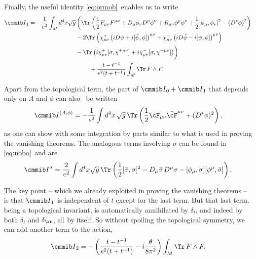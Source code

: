 Finally,  the useful identity \eqref{eq:ormob}\ enables us to write
\setcounter{equation}{45}
\begin{equation}\label{eq:nuseful}
\begin{aligned}{{\cmmib I}}_1=-{1\over e^2}\int_Md^4x \sqrt
g&\left(\Tr\left({1\over 2}F_{\mu\nu} F^{\mu\nu}+D_\mu\phi_\nu
D^\mu\phi^\nu +R_{\mu\nu}\phi^\mu\phi^\nu+ {1\over
2}[\phi_\mu,\phi_\nu]^2-(D^*\phi)^2
  \right)\right.\\ &-
2\Tr\left(\chi^+_{\mu\nu}\left(iD\psi+i[\tilde\psi,\phi]\right)^{\mu\nu}
+\chi^-_{\mu\nu}\left(iD\tilde\psi-i[\psi,\phi]\right)^{\mu\nu}\right)\\
&-\Tr\left(i\chi^+_{\mu\nu}[\sigma,\chi^{+\mu\nu}]+
i\chi^-_{\mu\nu}[\sigma,\chi^{-\mu\nu}] \right)\biggr)\\ &
~~~~~~~+{t-t^{-1}\over e^2(t+t^{-1})}\int_M\Tr\, F\wedge F.\\\end{aligned}
\end{equation}

Apart from the topological term, the part of ${{\cmmib
I}}_0+{{\cmmib I}}_1$ that depends only on $A$ and $\phi$ can also
\cite{ref53}\ be written %
\setcounter{equation}{46}
\begin{equation}\label{eq:wingo}
{{\cmmib I}}^{(A,\phi)}=-{1\over
e^2}\int d^4x\,\sqrt g\, \Tr\left({1\over 2}
\cF_{\mu\nu}\bar\cF^{\mu\nu}+(D^*\phi)^2\right),
\end{equation}
 as one can show
with some integration by parts similar to what is used in proving
the vanishing theorems.  The analogous terms involving $\sigma$
can be found in \eqref{eq:nobo}\ and are %
\setcounter{equation}{47}
\begin{equation}\label{eq:uwingo}
{\cmmib
I}^\sigma={2\over e^2}\int d^4x \sqrt g\,\Tr\left( {1\over
2}[\bar\sigma,\sigma]^2- D_\mu\bar\sigma\,D^\mu\sigma
-[\phi_\mu,\sigma][\phi^\mu,\bar\sigma]\right).
\end{equation}

The key point -- which we already exploited in proving the
vanishing theorems -- is that ${{\cmmib I}}_1$ is independent of
$t$ except for the last term.  But that last term, being a
topological invariant, is automatically annihilated by $\delta_t$,
and indeed by both $\delta_\ell$ and $\delta_\rr$, all by itself.
So without spoiling the topological symmetry, we can add another
term to the action, %
\setcounter{equation}{48}
\begin{equation}\label{eq:ucno}
{{\cmmib I}}_2=-\left({t-t^{-1}\over
e^2(t+t^{-1})}-i{\theta\over 8\pi^2}\right)\int_M\Tr\,F\wedge F.
\end{equation}

